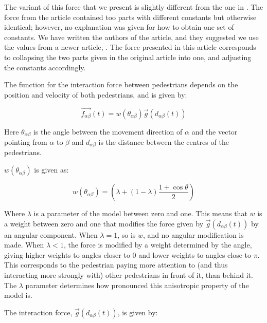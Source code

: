 The variant of this force that we present is slightly different from the one
in \cite{self-org}.  The force from the article contained too parts with
different constants but otherwise identical; however, no explanation was given
for how to obtain one set of constants. We have written the authors of the
article, and they suggested we use the values from a newer article,
\cite{ABconstant}. The force presented in this article corresponds to
collapsing the two parts given in the original article into one, and adjusting
the constants accordingly.

The function for the interaction force between pedestrians depends on the
position and velocity of both pedestrians, and is given by:

\begin{equation}
    \overrightarrow{f_{\alpha \beta }}(t) =
    w\left(\theta_{\alpha \beta}\right)
    \overrightarrow{g}\left(d_{\alpha \beta}(t)\right)
    \label{eq:pedestrianinteraction}
\end{equation}

Here $\theta_{\alpha \beta}$ is the angle between the movement direction of
$\alpha$ and the vector pointing from $\alpha$ to $\beta$ and $d_{\alpha
\beta}$ is the distance between the centres of the pedestrians.

$ w(\theta_{\alpha \beta})$ is given as:

\begin{equation}
    w\left(\theta_{\alpha \beta}\right)=
    \left(
        \lambda + \left(
            1 - \lambda
        \right)
		\frac{1+\cos{\theta}}{2}
    \right)
    \label{angleAB}
\end{equation}

Where $\lambda$ is a parameter of the model between zero and one. This means
that $w$ is a weight between zero and one that modifies the force given by
$\overrightarrow{g}\left(d_{\alpha \beta}(t)\right)$ by an angular component.
When $\lambda=1$, so is $w$, and no angular modification is made. When
$\lambda<1$, the force is modified by a weight determined by the angle, giving
higher weights to angles closer to $0$ and lower weights to angles close to
$\pi$. This corresponds to the pedestrian paying more attention to (and thus
interacting more strongly with) other pedestrians in front of it, than behind
it. The $\lambda$ parameter determines how pronounced this anisotropic
property of the model is.


The interaction force, $\overrightarrow{g}\left(d_{\alpha \beta} (t)\right)$, is
given by:

